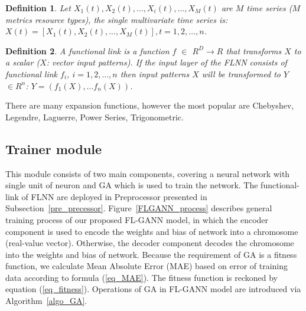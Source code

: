 \documentclass[conference]{IEEEtran}
\newtheorem{definition}{Definition}
\begin{document}
\begin{definition}
\label{definition_1}
Let $X_1(t), X_2(t),. . . , X_i(t),. . . , X_M(t) $ are $M$ time series ($M$ metrics resource types), the single multivariate time series is: \\
$ X(t) = \left[ X_1(t), X_2(t), . . . , X_M (t) \right],  t = 1, 2, . . . , n$.
\end{definition}

\begin{definition}
\label{definition_2}
A functional link is a function $f$ $\in$ $R^D \rightarrow R$ that transforms $X$ to a scalar ($X$: vector input patterns). If the input layer of the FLNN consists of functional link $f_i$, $i = 1,2,..., n$ then input patterns $X$ will be transformed to $Y$ $\in R^n$: $Y = (f_1(X),... f_n(X))$. 
\end{definition}

There are many expansion functions, however the most popular are Chebyshev, Legendre, Laguerre, Power Series, Trigonometric. 

\subsection{Trainer module}
\label{learning_model}
This module consists of two main components, covering a neural network with single unit of neuron and GA which is used to train the network. The functional-link of FLNN are deployed in Preprocessor presented in Subsection~\ref{pre_precessor}. Figure~\ref{FLGANN_process} describes general training process of our proposed FL-GANN model, in which the encoder component is used to encode the weights and bias of network into a chromosome (real-value vector). Otherwise, the decoder component decodes the chromosome into the weights and bias of network. Because the requirement of GA is a fitness function, we calculate Mean Absolute Error (MAE) based on error of training data according to formula (\ref{eq_MAE}). The fitness function is reckoned by equation (\ref{eq_fitness}). Operations of GA in FL-GANN model are introduced via Algorithm~\ref{algo_GA}.
\end{document}
